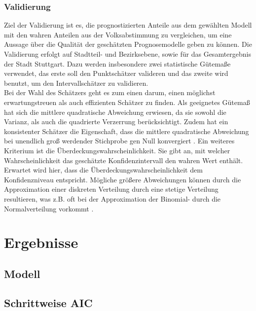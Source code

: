 \documentclass{Vorlage}
\begin{document}
\subsubsection{Validierung}
Ziel der Validierung ist es, die prognostizierten Anteile aus dem gewählten Modell mit den wahren Anteilen aus der 
Volksabstimmung \cite{Amt} zu vergleichen, um eine Aussage über die Qualität der geschätzten Prognosemodelle geben zu 
können. Die Validierung erfolgt auf Stadtteil- und Bezirksebene, sowie für das Gesamtergebnis der Stadt Stuttgart. Dazu 
werden insbesondere zwei statistische Gütemaße verwendet, das erste soll den Punktschätzer valideren und das zweite wird benutzt, um den Intervallschätzer zu validieren.\\
Bei der Wahl des Schätzers geht es zum einen darum, einen möglichst erwartungstreuen als auch effizienten Schätzer zu 
finden. Als geeignetes Gütemaß hat sich die mittlere quadratische Abweichung erwiesen, da sie sowohl die Varianz, als 
auch die quadrierte Verzerrung berücksichtigt. Zudem hat ein konsistenter Schätzer die Eigenschaft, dass die mittlere 
quadratische Abweichung bei unendlich groß werdender Stichprobe gen Null konvergiert \cite[p. 201]{HOG}. Ein weiteres 
Kriterium ist die Überdeckungswahrscheinlichkeit. Sie gibt an, mit welcher Wahrscheinlichkeit das geschätzte 
Konfidenzintervall den wahren Wert enthält. Erwartet wird hier, dass die Überdeckungswahrscheinlichkeit dem 
Konfidenzniveau entspricht. Mögliche größere Abweichungen können durch die Approximation einer diskreten Verteilung 
durch eine stetige Verteilung resultieren, was z.B. oft bei der Approximation der Binomial- durch die Normalverteilung 
vorkommt \cite[p. 102]{Int}.

\section{Ergebnisse}


\subsection{Modell}

\subsection{Schrittweise AIC}
\end{document}
